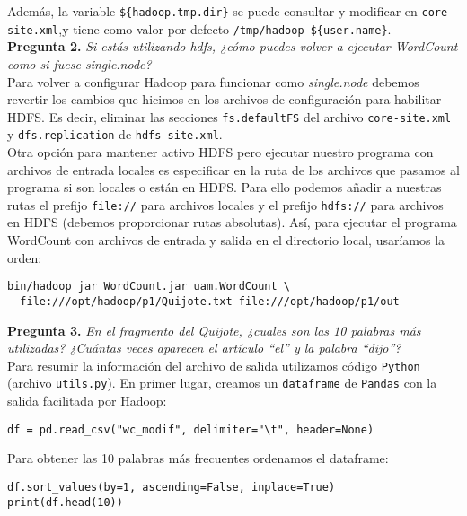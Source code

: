 \documentclass[11pt]{article}
\begin{document}
Además, la variable \verb|${hadoop.tmp.dir}| se puede consultar y modificar en \verb|core-site.xml|,y tiene como valor por defecto \verb|/tmp/hadoop-${user.name}|.\\

\textbf{Pregunta 2. }\emph{Si estás utilizando hdfs, ¿cómo puedes volver a ejecutar WordCount como si fuese single.node?}\\

Para volver a configurar Hadoop para funcionar como \textit{single.node} debemos revertir los cambios que hicimos en los archivos de configuración para habilitar HDFS. Es decir, eliminar las secciones \texttt{fs.defaultFS} del archivo \texttt{core-site.xml} y \texttt{dfs.replication} de \texttt{hdfs-site.xml}.\\

Otra opción para mantener activo HDFS pero ejecutar nuestro programa con archivos de entrada locales es especificar en la ruta de los archivos que pasamos al programa si son locales o están en HDFS. Para ello podemos añadir a nuestras rutas el prefijo \verb|file://| para archivos locales y el prefijo \verb|hdfs://| para archivos en HDFS (debemos proporcionar rutas absolutas). Así, para ejecutar el programa WordCount con archivos de entrada y salida en el directorio local, usaríamos la orden:

\begin{verbatim}
bin/hadoop jar WordCount.jar uam.WordCount \
  file:///opt/hadoop/p1/Quijote.txt file:///opt/hadoop/p1/out
\end{verbatim}

\textbf{Pregunta 3. }\emph{En el fragmento del Quijote, ¿cuales son las 10 palabras más utilizadas? ¿Cuántas veces aparecen el artículo ``el'' y la palabra ``dijo''?}\\

Para resumir la información del archivo de salida utilizamos código \texttt{Python} (archivo \verb|utils.py|). En primer lugar, creamos un \verb|dataframe| de \texttt{Pandas} con la salida facilitada por Hadoop:
\begin{verbatim}
df = pd.read_csv("wc_modif", delimiter="\t", header=None)
\end{verbatim}

Para obtener las 10 palabras más frecuentes ordenamos el dataframe:
\begin{verbatim}
df.sort_values(by=1, ascending=False, inplace=True)
print(df.head(10))
\end{verbatim}
\end{document}

